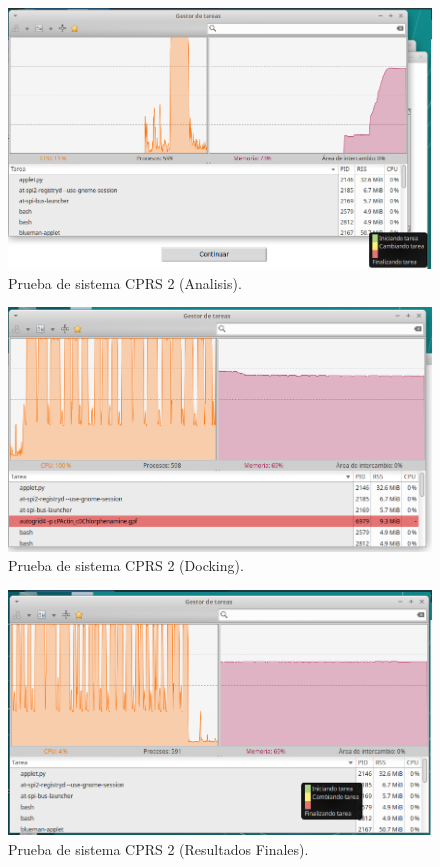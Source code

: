 \begin{figure}[H]
    \centering
    \includegraphics[scale=0.60]{Capitulo4/Documentos/Casos_de_sistema/imagenes_casos/ResultadosEsteban.png}
    \caption{Prueba de sistema CPRS 2 (Analisis).}
    \label{Evidencia2_1-2}
\end{figure}

\begin{figure}[H]
    \centering
    \includegraphics[scale=0.60]{Capitulo4/Documentos/Casos_de_sistema/imagenes_casos/DockingEsteban.png}
    \caption{Prueba de sistema CPRS 2 (Docking).}
    \label{Evidencia2_1-3}
\end{figure}

\begin{figure}[H]
    \centering
    \includegraphics[scale=0.60]{Capitulo4/Documentos/Casos_de_sistema/imagenes_casos/ResultadosFinalesEste.png}
    \caption{Prueba de sistema CPRS 2 (Resultados Finales).}
    \label{Evidencia2_1-4}
\end{figure}

